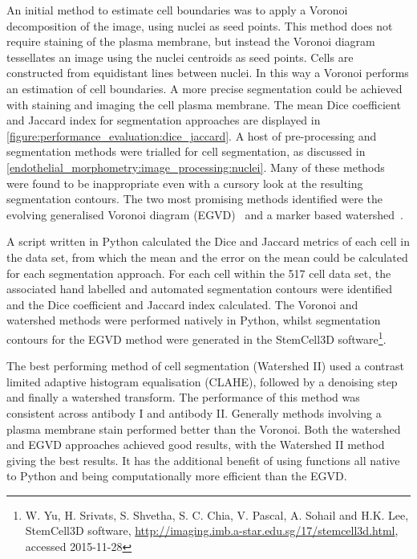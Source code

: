 An initial method to estimate cell boundaries was to apply a Voronoi decomposition of the image, using  nuclei as seed points. This method does not require staining of the plasma membrane, but instead the Voronoi diagram tessellates an image using the nuclei centroids as seed points. Cells are constructed from equidistant lines between nuclei. In this way a Voronoi performs an estimation of cell boundaries. A more precise segmentation could be achieved with staining and imaging the cell plasma membrane. The mean Dice coefficient and Jaccard index for segmentation approaches are displayed in \autoref{figure:performance_evaluation:dice_jaccard}. A host of pre-processing and segmentation methods were trialled for cell segmentation, as discussed in \autoref{endothelial_morphometry:image_processing:nuclei}. Many of these methods were found to be inappropriate even with a cursory look at the resulting segmentation contours. The two most promising methods identified were the evolving generalised Voronoi diagram (EGVD)~\cite{Yu2010} and a marker based watershed~\cite{Roerdink2000}.

A script written in Python calculated the Dice and Jaccard metrics of each cell in the data set, from which the mean and the error on the mean could be calculated for each segmentation approach. For each cell within the 517 cell data set, the associated hand labelled and automated segmentation contours were identified and the Dice coefficient and Jaccard index calculated. The Voronoi and watershed methods were performed natively in Python, whilst segmentation contours for the EGVD method  were generated in the StemCell3D software\footnote{W. Yu, H. Srivats, S. Shvetha, S. C. Chia, V. Pascal, A. Sohail and H.K. Lee, StemCell3D software, \url{http://imaging.imb.a-star.edu.sg/17/stemcell3d.html}, accessed 2015-11-28}.

The best performing method of cell segmentation (Watershed II) used a contrast limited adaptive histogram equalisation (CLAHE), followed by a denoising step and finally a watershed transform. The performance of this method was consistent across antibody I and antibody II. Generally methods involving a plasma membrane stain performed better than the Voronoi. Both the watershed and EGVD approaches achieved good results, with the Watershed II method giving the best results. It has the additional benefit of using functions all native to Python and being computationally more efficient than the EGVD.

